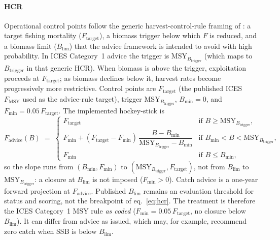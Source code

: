 \documentclass[11pt,a4paper]{article}
\newcommand{\Blim}{B_{\lim}}
\newcommand{\Btrig}{\mathrm{MSY}_{B_{\mathrm{trigger}}}}
\newcommand{\Ftar}{F_{\mathrm{target}}}
\begin{document}
\paragraph{HCR}
Operational control points follow the generic harvest-control-rule framing
of \citet{winker2026rebuilding}: a target fishing mortality ($\Ftar$), a
biomass trigger below which $F$ is reduced, and a biomass limit ($\Blim$)
that the advice framework is intended to avoid with high probability. In
ICES Category~1 advice the trigger is $\Btrig$ (which maps to
$B_{\mathrm{trigger}}$ in that generic HCR). When biomass is above the
trigger, exploitation proceeds at $\Ftar$; as biomass declines below it,
harvest rates become progressively more restrictive. Control points are
$\Ftar$ (the published ICES $F_{\mathrm{MSY}}$ used as the advice-rule
target), trigger $\Btrig$, $B_{\min}=0$, and
$F_{\min}=0.05\,\Ftar$. The implemented hockey-stick is
\begin{equation}
  F_{\mathrm{advice}}(B)
  \;=\;
  \begin{cases}
  \Ftar
    & \text{if } B \ge \Btrig,\\[0.35em]
  F_{\min}
    + (\Ftar - F_{\min})\,
      \dfrac{B - B_{\min}}{\Btrig - B_{\min}}
    & \text{if } B_{\min} < B < \Btrig,\\[0.75em]
  F_{\min}
    & \text{if } B \le B_{\min},
  \end{cases}
  \label{eq:hcr}
\end{equation}
so the slope runs from $(B_{\min},F_{\min})$ to $(\Btrig,\Ftar)$, not from
$\Blim$ to $\Btrig$: a closure at $\Blim$ is not imposed ($F_{\min}>0$).
Catch advice is a one-year forward projection at $F_{\mathrm{advice}}$.
Published $\Blim$ remains an evaluation threshold for status and scoring,
not the breakpoint of eq.~\eqref{eq:hcr}. The treatment is therefore the
ICES Category~1 MSY rule \emph{as coded} ($F_{\min}=0.05\,\Ftar$, no
closure below $\Blim$). It can differ from advice as issued, which may,
for example, recommend zero catch when SSB is below $\Blim$.
\end{document}
